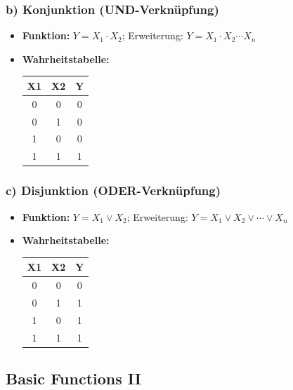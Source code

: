 \documentclass[11pt,a4paper]{article}
\begin{document}
\subsubsection{b) Konjunktion (UND-Verknüpfung)}
\begin{itemize}
    \item \textbf{Funktion:} $Y = X_1 \cdot X_2$; Erweiterung: $Y = X_1 \cdot X_2 \cdots X_n$
    \item \textbf{Wahrheitstabelle:}
    \begin{center}
    \begin{tabular}{ccc}
        \toprule
        X1 & X2 & Y \\ \midrule
        0 & 0 & 0 \\
        0 & 1 & 0 \\
        1 & 0 & 0 \\
        1 & 1 & 1 \\ \bottomrule
    \end{tabular}
    \end{center}
\end{itemize}

\subsubsection{c) Disjunktion (ODER-Verknüpfung)}
\begin{itemize}
    \item \textbf{Funktion:} $Y = X_1 \vee X_2$; Erweiterung: $Y = X_1 \vee X_2 \vee \cdots \vee X_n$
    \item \textbf{Wahrheitstabelle:}
    \begin{center}
    \begin{tabular}{ccc}
        \toprule
        X1 & X2 & Y \\ \midrule
        0 & 0 & 0 \\
        0 & 1 & 1 \\
        1 & 0 & 1 \\
        1 & 1 & 1 \\ \bottomrule
    \end{tabular}
    \end{center}
\end{itemize}

\subsection{Basic Functions II}
\end{document}

